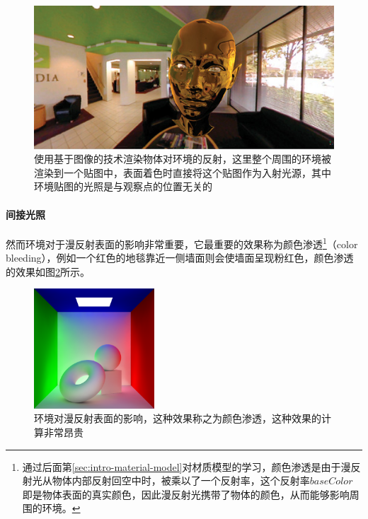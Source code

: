\begin{figure}
\includegraphics[width=1.\textwidth]{figures/intro/reflection-1}	
\caption{使用基于图像的技术渲染物体对环境的反射，这里整个周围的环境被渲染到一个贴图中，表面着色时直接将这个贴图作为入射光源，其中环境贴图的光照是与观察点的位置无关的}
\label{f:intro-reflection-2}
\end{figure}




\paragraph{间接光照}
然而环境对于漫反射表面的影响非常重要，它最重要的效果称为颜色渗透\footnote{通过后面第\ref{sec:intro-material-model}对材质模型的学习，颜色渗透是由于漫反射光从物体内部反射回空中时，被乘以了一个反射率，这个反射率$baseColor$即是物体表面的真实颜色，因此漫反射光携带了物体的颜色，从而能够影响周围的环境。}（color bleeding），例如一个红色的地毯靠近一侧墙面则会使墙面呈现粉红色，颜色渗透的效果如图\ref{f:intro-indirect}所示。

\begin{figure}
\sidecaption
\includegraphics[width=0.4\textwidth]{figures/intro/indirect}	
\caption{环境对漫反射表面的影响，这种效果称之为颜色渗透，这种效果的计算非常昂贵}
\label{f:intro-indirect}
\end{figure}

